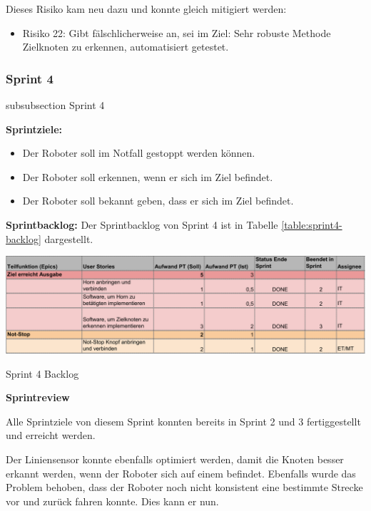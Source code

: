 Dieses Risiko kam neu dazu und konnte gleich mitigiert werden:

\begin{itemize}
    \item Risiko 22: Gibt fälschlicherweise an, sei im Ziel: Sehr robuste Methode Zielknoten zu erkennen, automatisiert getestet.
\end{itemize}

\newpage


\subsubsection*{Sprint 4}
    {subsubsection}
    {Sprint 4}
    
\textbf{Sprintziele:}
\begin{itemize}
    \item Der Roboter soll im Notfall gestoppt werden können.
    \item Der Roboter soll erkennen, wenn er sich im Ziel befindet.
    \item Der Roboter soll bekannt geben, dass er sich im Ziel befindet.
\end{itemize}

\textbf{Sprintbacklog:} Der Sprintbacklog von Sprint 4 ist in Tabelle 
\ref{table:sprint4-backlog} 
dargestellt.


\begin{table}[H]
\centering
\includegraphics[width=\textwidth]{assets/projektmanagement/sprint4-crop.pdf}
\caption{Sprint 4 Backlog}
\label{table:sprint4-backlog}
\end{table}


\textbf{Sprintreview}

Alle Sprintziele von diesem Sprint konnten bereits in Sprint 2 und 3 fertiggestellt und erreicht werden.

Der Liniensensor konnte ebenfalls optimiert werden, damit die Knoten besser erkannt werden, wenn der Roboter sich auf einem befindet. Ebenfalls wurde das Problem behoben, dass der Roboter noch nicht konsistent eine bestimmte Strecke vor und zurück fahren konnte. Dies kann er nun.

